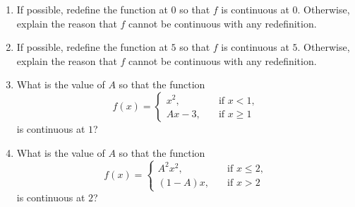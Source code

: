 \documentclass[11pt]{book}
\theoremstyle{break}
\theoremstyle{no_label}
\numberwithin{equation}{section}
\begin{document}
\begin{enumerate}[label=\arabic*.]
\begin{enumerate}
    \end{enumerate}
    \item If possible, redefine the function at $0$ so that $f$ is continuous at $0$. Otherwise, explain the reason that $f$ cannot be continuous with any redefinition.
    \begin{enumerate}
    \end{enumerate}
    \item If possible, redefine the function at $5$ so that $f$ is continuous at $5$. Otherwise, explain the reason that $f$ cannot be continuous with any redefinition.
    \begin{enumerate}
    \end{enumerate}
    \item What is the value of $A$ so that the function $$f(x)=\left\{\begin{array}{rl}
        x^2, \quad & \text{if $x<1$},\\
        Ax-3, \quad & \text{if $x\geq1$}
    \end{array}\right.$$ is continuous at $1$?
    \item What is the value of $A$ so that the function $$f(x)=\left\{\begin{array}{rl}
        A^2x^2, \quad & \text{if $x\leq2$},\\
        (1-A)x, \quad & \text{if $x>2$}
    \end{array}\right.$$ is continuous at $2$?

\end{enumerate}
\end{document}
